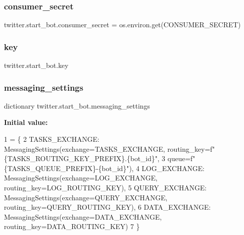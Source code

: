 \mbox{\label{namespacetwitter_1_1start__bot_aa6ff8a67f0b9fa5ce0aa135e6c35e40b}} 
\subsubsection{\texorpdfstring{consumer\+\_\+secret}{consumer\_secret}}
{\footnotesize\ttfamily twitter.\+start\+\_\+bot.\+consumer\+\_\+secret = os.\+environ.\+get(\textquotesingle{}C\+O\+N\+S\+U\+M\+E\+R\+\_\+\+S\+E\+C\+R\+ET\textquotesingle{})}

\mbox{\label{namespacetwitter_1_1start__bot_a55145bbc29d72c1cfad0d8def9a015ad}} 
\subsubsection{\texorpdfstring{key}{key}}
{\footnotesize\ttfamily twitter.\+start\+\_\+bot.\+key}

\mbox{\label{namespacetwitter_1_1start__bot_aafa8c2a48201b4089e1ff9ca970da94f}} 
\subsubsection{\texorpdfstring{messaging\+\_\+settings}{messaging\_settings}}
{\footnotesize\ttfamily dictionary twitter.\+start\+\_\+bot.\+messaging\+\_\+settings}

{\bfseries Initial value\+:}
\begin{DoxyCode}
1 =  \{
2         TASKS\_EXCHANGE: MessagingSettings(exchange=TASKS\_EXCHANGE, routing\_key=f\textcolor{stringliteral}{"
      \{TASKS\_ROUTING\_KEY\_PREFIX\}.\{bot\_id\}"},
3                                           queue=f\textcolor{stringliteral}{"\{TASKS\_QUEUE\_PREFIX\}-\{bot\_id\}"}),
4         LOG\_EXCHANGE: MessagingSettings(exchange=LOG\_EXCHANGE, routing\_key=LOG\_ROUTING\_KEY),
5         QUERY\_EXCHANGE: MessagingSettings(exchange=QUERY\_EXCHANGE, routing\_key=QUERY\_ROUTING\_KEY),
6         DATA\_EXCHANGE: MessagingSettings(exchange=DATA\_EXCHANGE, routing\_key=DATA\_ROUTING\_KEY)
7     \}
\end{DoxyCode}
\mbox{\label{namespacetwitter_1_1start__bot_a4d5d5aa82b155af04ee018403ac51201}} 
